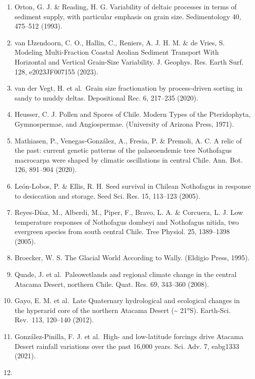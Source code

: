 \documentclass[
]{article}
\begin{document}
\begin{enumerate}
  a new method of endmember modeling using hierarchical clustering.
  Quat. Res. 89, 365--373 (2018).
\item
  Orton, G. J. \& Reading, H. G. Variability of deltaic processes in
  terms of sediment supply, with particular emphasis on grain size.
  Sedimentology 40, 475--512 (1993).
\item
  van IJzendoorn, C. O., Hallin, C., Reniers, A. J. H. M. \& de Vries,
  S. Modeling Multi-Fraction Coastal Aeolian Sediment Transport With
  Horizontal and Vertical Grain-Size Variability. J. Geophys. Res. Earth
  Surf. 128, e2023JF007155 (2023).
\item
  van der Vegt, H. et al.~Grain size fractionation by process-driven
  sorting in sandy to muddy deltas. Depositional Rec. 6, 217--235
  (2020).
\item
  Heusser, C. J. Pollen and Spores of Chile. Modern Types of the
  Pteridophyta, Gymnospermae, and Angiospermae. (University of Arizona
  Press, 1971).
\item
  Mathiasen, P., Venegas-González, A., Fresia, P. \& Premoli, A. C. A
  relic of the past: current genetic patterns of the palaeoendemic tree
  Nothofagus macrocarpa were shaped by climatic oscillations in central
  Chile. Ann. Bot. 126, 891--904 (2020).
\item
  León-Lobos, P. \& Ellis, R. H. Seed survival in Chilean Nothofagus in
  response to desiccation and storage. Seed Sci. Res. 15, 113--123
  (2005).
\item
  Reyes-Díaz, M., Alberdi, M., Piper, F., Bravo, L. A. \& Corcuera, L.
  J. Low temperature responses of Nothofagus dombeyi and Nothofagus
  nitida, two evergreen species from south central Chile. Tree Physiol.
  25, 1389--1398 (2005).
\item
  Broecker, W. S. The Glacial World According to Wally. (Eldigio Press,
  1995).
\item
  Quade, J. et al.~Paleowetlands and regional climate change in the
  central Atacama Desert, northern Chile. Quat. Res. 69, 343--360
  (2008).
\item
  Gayo, E. M. et al.~Late Quaternary hydrological and ecological changes
  in the hyperarid core of the northern Atacama Desert
  (\textasciitilde{} 21°S). Earth-Sci. Rev.~113, 120--140 (2012).
\item
  González-Pinilla, F. J. et al.~High- and low-latitude forcings drive
  Atacama Desert rainfall variations over the past 16,000 years. Sci.
  Adv. 7, eabg1333 (2021).
\item

\end{enumerate}
\end{document}
